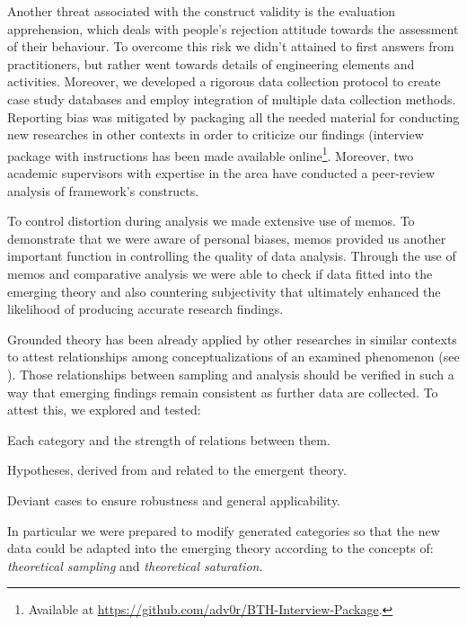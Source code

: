 \documentclass[10pt,journal,letterpaper,compsoc]{IEEEtran}
\begin{document}
Another threat associated with the construct validity is the evaluation 
apprehension, which deals with people's rejection attitude towards the 
assessment of their behaviour. To overcome this risk we didn't attained to first 
answers from practitioners, but rather went towards details of engineering 
elements and activities. Moreover, we developed a rigorous data collection 
protocol to create case study databases and employ integration of multiple data 
collection methods. Reporting bias was mitigated by packaging all the needed 
material for conducting new researches in other contexts in order to criticize 
our findings (interview package with instructions has been made available 
online\footnote{Available at 
\url{https://github.com/adv0r/BTH-Interview-Package}.}. Moreover, two academic 
supervisors with expertise in the area have conducted a peer-review analysis of 
framework's constructs.

To control distortion during analysis we made extensive use of memos. To 
demonstrate that we were aware of personal biases, memos provided us another 
important function in controlling the quality of data analysis. Through the use 
of memos and comparative analysis we were able to check if data fitted into the 
emerging theory and also countering subjectivity that ultimately enhanced the 
likelihood of producing accurate research findings.

Grounded theory has been already applied by other researches in similar 
contexts to attest relationships among conceptualizations of an examined 
phenomenon (see \cite{Coleman2007, Basri, Coleman2008a}). Those relationships 
between sampling and analysis should be verified in such a way that emerging 
findings remain consistent as further data are collected. To attest this, we  
explored and tested:


\begin{compactitem}
\item Each category and the strength of relations between them.
\item Hypotheses, derived from and related to the emergent theory.
\item Deviant cases to ensure robustness and general applicability.
\end{compactitem}


In particular we were prepared to modify generated categories so that the new 
data could be adapted into the emerging theory according to the concepts of: 
\textit{theoretical sampling} and \textit{theoretical saturation}.
\end{document}
